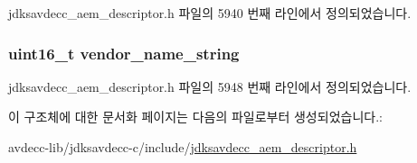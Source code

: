 jdksavdecc\+\_\+aem\+\_\+descriptor.\+h 파일의 5940 번째 라인에서 정의되었습니다.

\subsubsection[{\texorpdfstring{vendor\+\_\+name\+\_\+string}{vendor_name_string}}]{\setlength{\rightskip}{0pt plus 5cm}uint16\+\_\+t vendor\+\_\+name\+\_\+string}\hypertarget{structjdksavdecc__descriptor__entity_a549d6f7287556a7baa0df2a68065e602}{}\label{structjdksavdecc__descriptor__entity_a549d6f7287556a7baa0df2a68065e602}


jdksavdecc\+\_\+aem\+\_\+descriptor.\+h 파일의 5948 번째 라인에서 정의되었습니다.



이 구조체에 대한 문서화 페이지는 다음의 파일로부터 생성되었습니다.\+:\begin{DoxyCompactItemize}
\item 
avdecc-\/lib/jdksavdecc-\/c/include/\hyperlink{jdksavdecc__aem__descriptor_8h}{jdksavdecc\+\_\+aem\+\_\+descriptor.\+h}\end{DoxyCompactItemize}
